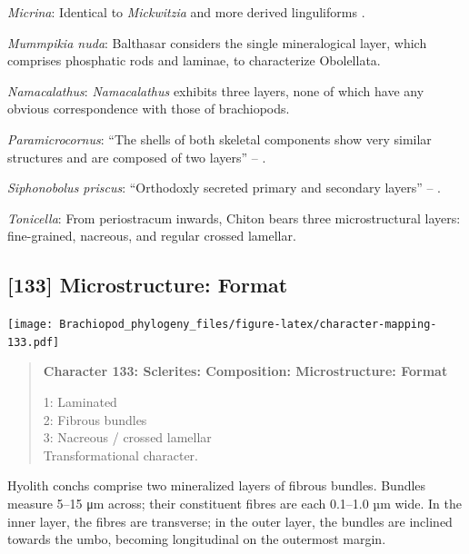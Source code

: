 \documentclass[openany]{book}
\begin{document}
\hypertarget{Micrina-coding-132}{}
\emph{Micrina}: Identical to \emph{Mickwitzia} and more derived
linguliforms \citep{Holmer2011Firstrecord}.

\hypertarget{Mummpikia_nuda-coding-132}{}
\emph{Mummpikia nuda}: Balthasar \citeyearpar{Balthasar2008iMummpikia}
considers the single mineralogical layer, which comprises phosphatic
rods and laminae, to characterize Obolellata.

\hypertarget{Namacalathus-coding-132}{}
\emph{Namacalathus}: \emph{Namacalathus} exhibits three layers, none of
which have any obvious correspondence with those of brachiopods.

\hypertarget{Paramicrocornus-coding-132}{}
\emph{Paramicrocornus}: ``The shells of both skeletal components show
very similar structures and are composed of two layers'' --
\citet{Zhang2018Ahyolithid}.

\hypertarget{Siphonobolus_priscus-coding-132}{}
\emph{Siphonobolus priscus}: ``Orthodoxly secreted primary and secondary
layers'' -- \citet{Williams2004Chemicostructure}.

\hypertarget{Tonicella-coding-132}{}
\emph{Tonicella}: From periostracum inwards, Chiton bears three
microstructural layers: fine-grained, nacreous, and regular crossed
lamellar.

\subsection*{{[}133{]} Microstructure:
Format}\label{microstructure-format}

\texttt{[image: Brachiopod\_phylogeny\_files/figure-latex/character-mapping-133.pdf]}

\begin{quote}
\textbf{Character 133: Sclerites: Composition: Microstructure: Format}

1: Laminated\\
2: Fibrous bundles\\
3: Nacreous / crossed lamellar\\
Transformational character.
\end{quote}

Hyolith conchs comprise two mineralized layers of fibrous bundles.
Bundles measure 5--15 μm across; their constituent fibres are each
0.1--1.0 µm wide. In the inner layer, the fibres are transverse; in the
outer layer, the bundles are inclined towards the umbo, becoming
longitudinal on the outermost margin.
\end{document}
